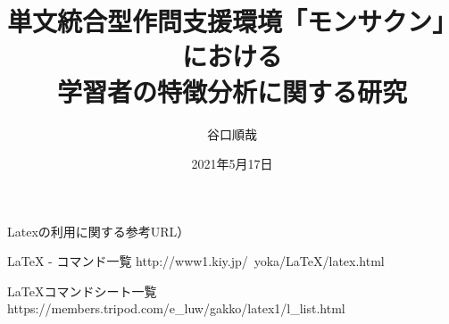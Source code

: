 \documentclass[chukan]{hitsotsuron} %
\title{単文統合型作問支援環境「モンサクン」における\\学習者の特徴分析に関する研究}
\author{谷口順哉}
\date{2021年5月17日}
\begin{document}

\twocolumn[%
\maketitle
]


Latexの利用に関する参考URL）

LaTeX - コマンド一覧
http://www1.kiy.jp/~yoka/LaTeX/latex.html

LaTeXコマンドシート一覧
https://members.tripod.com/e_luw/gakko/latex1/l_list.html

\fi









\end{document}
